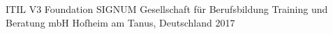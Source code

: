 

\begin{cvhonors}

  \cvhonor
    {ITIL V3 Foundation} %
    {SIGNUM Gesellschaft für Berufsbildung Training und Beratung mbH} %
    {Hofheim am Tanus, Deutschland} %
    {2017} %

\end{cvhonors}
